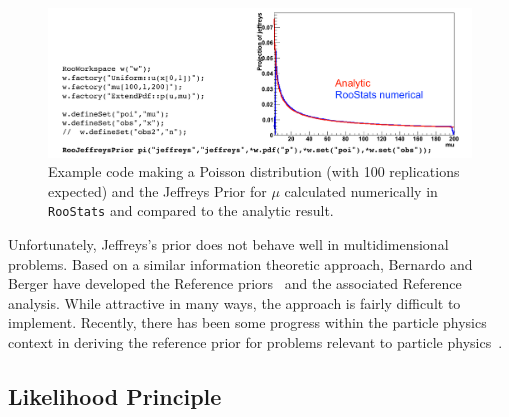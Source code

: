 \documentclass{cernrep}
\begin{document}
\begin{figure}[htbp]
\begin{center}
\includegraphics[width=.8\textwidth]{JeffreysPriorPoisson}
\caption{Example code making a Poisson distribution (with 100 replications expected) and the Jeffreys Prior for $\mu$ calculated numerically in \texttt{RooStats} and compared to the analytic result.  }
\label{fig:JeffreysPriorPoisson}
\end{center}
\end{figure}

Unfortunately, Jeffreys's prior does not behave well in multidimensional problems.  Based on a similar information theoretic approach, Bernardo and Berger have developed the Reference priors~\cite{Berger:1992ys,Berger:1992vn,Berger:1989kx,Bernardo:1979uq} and the associated Reference analysis.  While attractive in many ways, the approach is fairly difficult to implement.  Recently,  there has been some progress within the particle physics context in deriving the reference prior for problems relevant to particle physics~\cite{Demortier:2010sn,Casadei:2011hx}.



%
%
%

\subsection{Likelihood Principle}
\end{document}
